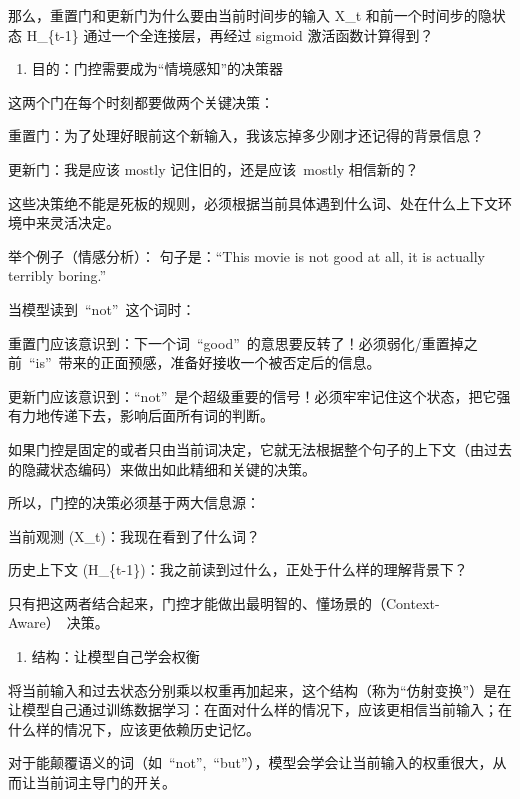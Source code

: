 那么，重置门和更新门为什么要由当前时间步的输入 X\_t 和前一个时间步的隐状态 H\_\{t-1\} 通过一个全连接层，再经过 sigmoid 激活函数计算得到？

\begin{enumerate}
\def\labelenumi{\arabic{enumi}.}
\tightlist
\item
  目的：门控需要成为``情境感知''的决策器
\end{enumerate}

这两个门在每个时刻都要做两个关键决策：

重置门：为了处理好眼前这个新输入，我该忘掉多少刚才还记得的背景信息？

更新门：我是应该 mostly 记住旧的，还是应该~mostly 相信新的？

这些决策绝不能是死板的规则，必须根据当前具体遇到什么词、处在什么上下文环境中来灵活决定。

举个例子（情感分析）：
句子是：``This movie is not good at all, it is actually terribly boring.''

当模型读到~``not''~这个词时：

重置门应该意识到：下一个词~``good''~的意思要反转了！必须弱化/重置掉之前~``is''~带来的正面预感，准备好接收一个被否定后的信息。

更新门应该意识到：``not''~是个超级重要的信号！必须牢牢记住这个状态，把它强有力地传递下去，影响后面所有词的判断。

如果门控是固定的或者只由当前词决定，它就无法根据整个句子的上下文（由过去的隐藏状态编码）来做出如此精细和关键的决策。

所以，门控的决策必须基于两大信息源：

当前观测 (X\_t)：我现在看到了什么词？

历史上下文 (H\_\{t-1\})：我之前读到过什么，正处于什么样的理解背景下？

只有把这两者结合起来，门控才能做出最明智的、懂场景的（Context-Aware）~决策。

\begin{enumerate}
\def\labelenumi{\arabic{enumi}.}
\setcounter{enumi}{1}
\tightlist
\item
  结构：让模型自己学会权衡
\end{enumerate}

将当前输入和过去状态分别乘以权重再加起来，这个结构（称为``仿射变换''）是在让模型自己通过训练数据学习：在面对什么样的情况下，应该更相信当前输入；在什么样的情况下，应该更依赖历史记忆。

对于能颠覆语义的词（如~``not'',~``but''），模型会学会让当前输入的权重很大，从而让当前词主导门的开关。

